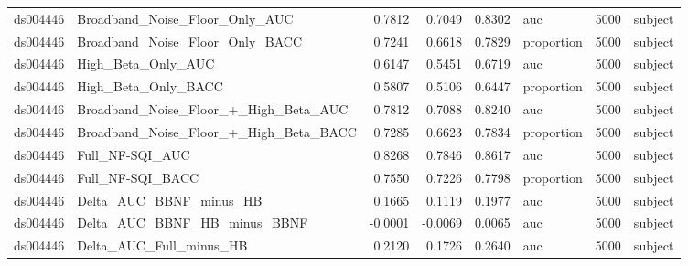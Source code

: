\begin{tabular}{llrrrlrl}
ds004446 & Broadband_Noise_Floor_Only_AUC & 0.7812 & 0.7049 & 0.8302 & auc & 5000 & subject \\
ds004446 & Broadband_Noise_Floor_Only_BACC & 0.7241 & 0.6618 & 0.7829 & proportion & 5000 & subject \\
ds004446 & High_Beta_Only_AUC & 0.6147 & 0.5451 & 0.6719 & auc & 5000 & subject \\
ds004446 & High_Beta_Only_BACC & 0.5807 & 0.5106 & 0.6447 & proportion & 5000 & subject \\
ds004446 & Broadband_Noise_Floor_+_High_Beta_AUC & 0.7812 & 0.7088 & 0.8240 & auc & 5000 & subject \\
ds004446 & Broadband_Noise_Floor_+_High_Beta_BACC & 0.7285 & 0.6623 & 0.7834 & proportion & 5000 & subject \\
ds004446 & Full_NF-SQI_AUC & 0.8268 & 0.7846 & 0.8617 & auc & 5000 & subject \\
ds004446 & Full_NF-SQI_BACC & 0.7550 & 0.7226 & 0.7798 & proportion & 5000 & subject \\
ds004446 & Delta_AUC_BBNF_minus_HB & 0.1665 & 0.1119 & 0.1977 & auc & 5000 & subject \\
ds004446 & Delta_AUC_BBNF_HB_minus_BBNF & -0.0001 & -0.0069 & 0.0065 & auc & 5000 & subject \\
ds004446 & Delta_AUC_Full_minus_HB & 0.2120 & 0.1726 & 0.2640 & auc & 5000 & subject \\
\bottomrule
\end{tabular}
